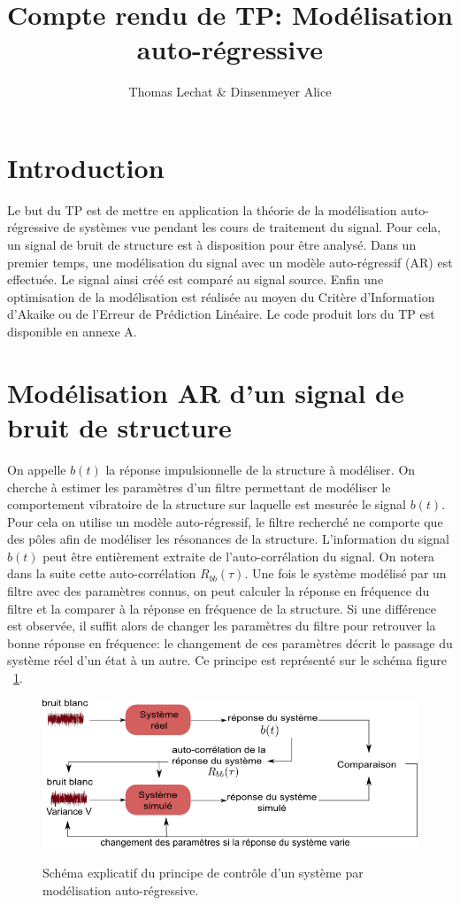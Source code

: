 \documentclass[a4paper]{article}
\title{Compte rendu de TP: Modélisation auto-régressive }
\author{Thomas Lechat \& Dinsenmeyer Alice}
\begin{document}
\maketitle



\section{Introduction}
Le but du TP est de mettre en application la théorie de la modélisation auto-régressive de systèmes vue pendant les cours de traitement du signal. Pour cela, un signal de bruit de structure est à disposition pour être analysé. Dans un premier temps, une modélisation du signal avec un modèle auto-régressif (AR) est effectuée. Le signal ainsi créé est comparé au signal source. Enfin une optimisation de la modélisation est réalisée au moyen du Critère d'Information d'Akaike ou de l'Erreur de Prédiction Linéaire.
Le code produit lors du TP est disponible en annexe A.


\section{Modélisation AR d'un signal de bruit de structure}
On appelle $b(t)$ la réponse impulsionnelle de la structure à modéliser. On cherche à estimer les paramètres d'un filtre permettant de modéliser le comportement vibratoire de la structure sur laquelle est mesurée le signal $b(t)$. Pour cela on utilise un modèle auto-régressif, le filtre recherché ne comporte que des pôles afin de modéliser les résonances de la structure. L'information du signal $b(t)$ peut être entièrement extraite de l'auto-corrélation du signal. On notera dans la suite cette auto-corrélation $R_{bb}(\tau)$. 
\bigskip
Une fois le système modélisé par un filtre avec des paramètres connus, on peut calculer la réponse en fréquence du filtre et la comparer à la réponse en fréquence de la structure. Si une différence est observée, il suffit alors de changer les paramètres du filtre pour retrouver la bonne réponse en fréquence: le changement de ces paramètres décrit le passage du système réel d'un état à un autre. Ce principe est représenté sur le schéma figure ~\ref{schema1}.

\begin{figure}[!h]
	\centering
	\includegraphics[scale=0.7]{schema_explicatif.png}
    \label{schema1}
    \caption{Schéma explicatif du principe de contrôle d'un système par modélisation auto-régressive.}
\end{figure}
\end{document}

